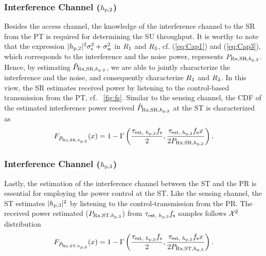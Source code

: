 \subsubsection*{Interference Channel ($h_{\text{p,2}}$)}
Besides the access channel, the knowledge of the interference channel to the SR from the PT is required for determining the SU throughput. It is worthy to note that the expression $|h_{\text{p,2}}|^2 \sigma^2_{\text{s}} + \sigma^2_{\text{w}}$ in $R_{\text{1}}$ and $R_{\text{3}}$, cf. (\ref{eq:Cap1}) and (\ref{eq:Cap3}), which corresponds to the interference and the noise power, represents $P_{\text{Rx,SR,$h_{\text{p,2}}$}}$. Hence, by estimating $\hat{P}_{\text{Rx,SR,$h_{\text{p,2}}$}}$, we are able to jointly characterize the interference and the noise, and consequently characterize $R_{\text{1}}$ and $R_{\text{3}}$.  
In this view, the SR estimates received power by listening to the control-based transmission from the PT, cf. \figurename~\ref{fig:fs}. Similar to the sensing channel, the CDF of the estimated interference power received $\hat{P}_{\text{Rx,SR,$h_{\text{p,2}}$}}$ at the ST is characterized as
\begin{align}
\feprcvdsr(x) = 1 - \Gamma \left( \frac{\testptsr \fsam}{2}, \frac{\testptsr \fsam x}{2 \prcvdsr} \right) \label{eq:fprcvdsr}.
\end{align}

  

\subsubsection*{Interference Channel ($h_{\text{p,3}}$)}
Lastly, the estimation of the interference channel between the ST and the PR is essential for employing the power control at the ST. Like the sensing channel, the ST estimates $|h_{\text{p,3}}|^2$ by listening to the control-transmission from the PR. The received power estimated ($P_{\text{Rx,ST,$h_{\text{p,3}}$}}$) from $\tau_{\text{est, $h_{\text{p,3}}$}} f_{\text{s}}$ samples follows $\cchi2$ distribution 
\begin{align}
\feprcvdstpr(x) = 1 - \Gamma \left( \frac{\testpr \fsam}{2}, \frac{\testpr \fsam x}{2 \prcvdstpr} \right) \label{eq:fprcvdstpr}.
\end{align}


